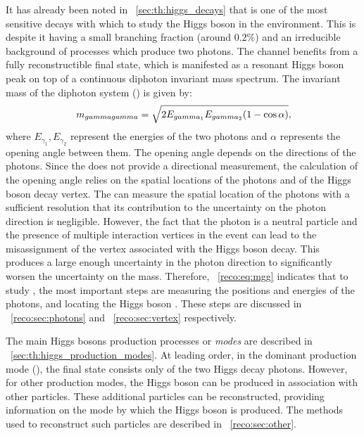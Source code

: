 It has already been noted in \Sec~\ref{sec:th:higgs_decays} that \Hgg is one of the most sensitive decays with which to study the Higgs boson in the \LHC environment. This is despite it having a small branching fraction (around $0.2\%$) and an irreducible background of \SM processes which produce two photons. The channel benefits from a fully reconstructible final state, which is manifested as a resonant Higgs boson peak on top of a continuous diphoton invariant mass spectrum.
The invariant mass of the diphoton system (\mgg) is given by:
\begin{equation}
\label{reco:eq:mgg}
 \,m_{gammagamma} = \sqrt{2 E_{gamma_{1}} E_{gamma_{2}} (1-\cos\alpha)}, 
\end{equation}
where $E_{\gamma_{1}},E_{\gamma_{2}}$ represent the energies of the two photons and $\alpha$ represents the opening angle between them. 
The opening angle depends on the directions of the photons. Since the \CMS \ECAL does not provide a directional measurement, the calculation of the opening angle relies on the spatial locations of the photons and of the Higgs boson decay vertex. The \CMS \ECAL can measure the spatial location of the photons with a sufficient resolution that its contribution to the uncertainty on the photon direction is negligible. However, the fact that the photon is a neutral particle and the presence of multiple interaction vertices in the event can lead to the misassignment of the vertex associated with the Higgs boson decay. This produces a large enough uncertainty in the photon direction to significantly worsen the uncertainty on the mass.
Therefore, \Eq~\ref{reco:eq:mgg} indicates that to study \Hgg, the most important steps are measuring the positions and energies of the photons, and locating the Higgs boson \PV. These steps are discussed in \Sec~\ref{reco:sec:photons} and \Sec~\ref{reco:sec:vertex} respectively. 

The main Higgs bosons production processes or \emph{modes} are described in \Sec~\ref{sec:th:higgs_production_modes}. At leading order, in the dominant production mode (\ggH), the final state consists only of the two Higgs decay photons. However, for other production modes, the Higgs boson can be produced in association with other particles. These additional particles can be reconstructed, providing information on the mode by which the Higgs boson is produced. The methods used to reconstruct such particles are described in \Sec~\ref{reco:sec:other}.


